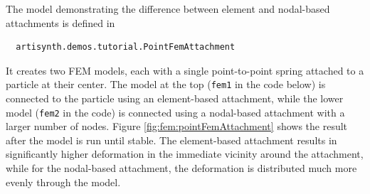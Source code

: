 The model demonstrating the difference between element and
nodal-based attachments is defined in
%
\begin{verbatim}
  artisynth.demos.tutorial.PointFemAttachment
\end{verbatim}
%
It creates two FEM models, each
with a single point-to-point spring attached to a particle at their
center. The model at the top ({\tt fem1} in the code below) is
connected to the particle using an element-based attachment, while the
lower model ({\tt fem2} in the code) is connected using a nodal-based
attachment with a larger number of nodes. Figure
\ref{fig:fem:pointFemAttachment} shows the result after the model is
run until stable. The element-based attachment results in
significantly higher deformation in the immediate vicinity around the
attachment, while for the nodal-based attachment, the deformation is
distributed much more evenly through the model.

